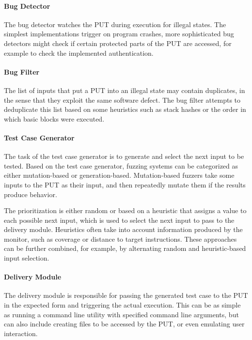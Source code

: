 \documentclass{article}
\begin{document}
\begin{multicols}{2}
    \paragraph{Bug Detector}
    The bug detector watches the PUT during execution for illegal states. The simplest implementations trigger on program crashes, more sophisticated bug detectors might check if certain protected parts of the PUT are accessed, for example to check the implemented authentication.

    \paragraph{Bug Filter}
    The list of inputs that put a PUT into an illegal state may contain duplicates, in the sense that they exploit the same software defect. The bug filter attempts to deduplicate this list based on some heuristics such as stack hashes or the order in which basic blocks were executed.

    \paragraph{Test Case Generator}
    The task of the test case generator is to generate and select the next input to be tested. Based on the test case generator, fuzzing systems can be categorized as either mutation-based or generation-based. Mutation-based fuzzers take some inputs to the PUT as their input, and then repeatedly mutate them if the results produce  behavior\cite{EvaluatingFuzzTesting}.

    The prioritization is either random or based on a heuristic that assigns a value to each possible next input, which is used to select the next input to pass to the delivery module. Heuristics often take into account information produced by the monitor, such as coverage or distance to target instructions. These approaches can be further combined, for example, by alternating random and heuristic-based input selection.

    \paragraph{Delivery Module}
    The delivery module is responsible for passing the generated test case to the PUT in the expected form and triggering the actual execution. This can be as simple as running a command line utility with specified command line arguments, but can also include creating files to be accessed by the PUT, or even emulating user interaction.


\end{multicols}
\end{document}
